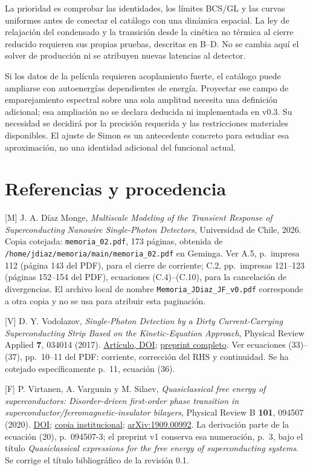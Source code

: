 \documentclass[
  spanish,
  10pt,
  a4paper,
]{article}
\begin{document}
La prioridad es comprobar las identidades, los límites BCS/GL y las
curvas uniformes antes de conectar el catálogo con una dinámica
espacial. La ley de relajación del condensado y la transición desde la
cinética no térmica al cierre reducido requieren sus propias pruebas,
descritas en B--D. No se cambia aquí el solver de producción ni se
atribuyen nuevas latencias al detector.

Si los datos de la película requieren acoplamiento fuerte, el catálogo
puede ampliarse con autoenergías dependientes de energía. Proyectar ese
campo de emparejamiento espectral sobre una sola amplitud necesita una
definición adicional; esa ampliación no se declara deducida ni
implementada en v0.3. Su necesidad se decidirá por la precisión
requerida y las restricciones materiales disponibles. El ajuste de Simon
es un antecedente concreto para estudiar esa aproximación, no una
identidad adicional del funcional actual.

\section{Referencias y procedencia}\label{referencias-y-procedencia}

{[}M{]} J. A. Díaz Monge, \emph{Multiscale Modeling of the Transient
Response of Superconducting Nanowire Single-Photon Detectors},
Universidad de Chile, 2026. Copia cotejada: \nolinkurl{memoria_02.pdf},
173 páginas, obtenida de
\nolinkurl{/home/jdiaz/memoria/main/memoria_02.pdf} en Geminga. Ver A.5,
p.~impresa 112 (página 143 del PDF), para el cierre de corriente; C.2,
pp.~impresas 121--123 (páginas 152--154 del PDF), ecuaciones
(C.4)--(C.10), para la cancelación de divergencias. El archivo local de
nombre \nolinkurl{Memoria_JDiaz_JF_v0.pdf} corresponde a otra copia y no
se usa para atribuir esta paginación.

{[}V{]} D. Y. Vodolazov, \emph{Single-Photon Detection by a Dirty
Current-Carrying Superconducting Strip Based on the Kinetic-Equation
Approach}, Physical Review Applied \textbf{7}, 034014 (2017).
\href{https://doi.org/10.1103/PhysRevApplied.7.034014}{Artículo, DOI};
\href{https://arxiv.org/pdf/1611.06060}{preprint completo}. Ver
ecuaciones (33)--(37), pp.~10--11 del PDF: corriente, corrección del RHS
y continuidad. Se ha cotejado específicamente p.~11, ecuación (36).

{[}F{]} P. Virtanen, A. Vargunin y M. Silaev, \emph{Quasiclassical free
energy of superconductors: Disorder-driven first-order phase transition
in superconductor/ferromagnetic-insulator bilayers}, Physical Review B
\textbf{101}, 094507 (2020).
\href{https://doi.org/10.1103/PhysRevB.101.094507}{DOI};
\href{https://jyx.jyu.fi/bitstreams/f577693c-c6d1-4923-866c-353ec3ac8dd5/download}{copia
institucional};
\href{https://arxiv.org/pdf/1909.00992}{arXiv:1909.00992}. La derivación
parte de la ecuación (20), p.~094507-3; el preprint v1 conserva esa
numeración, p.~3, bajo el título \emph{Quasiclassical expressions for
the free energy of superconducting systems}. Se corrige el título
bibliográfico de la revisión 0.1.
\end{document}
